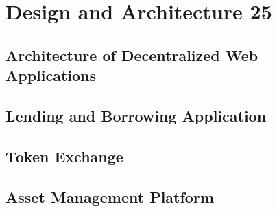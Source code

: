 \chapter{Design and Architecture 25}
\label{cha:DesignArchitecture}

\section{Architecture of Decentralized Web Applications}
\section{Lending and Borrowing Application}
\section{Token Exchange}
\section{Asset Management Platform}
